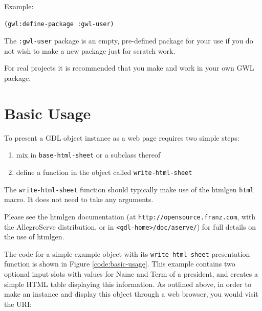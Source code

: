 \documentclass [11pt]{book}
\begin{document}
Example:

\begin{verbatim}(gwl:define-package :gwl-user)
\end{verbatim}The \texttt{:gwl-user} package is an empty, pre-defined package for your use if you 
do not wish to make a new package just for scratch work.

For real projects it is recommended that you make and work in your
own GWL package.

\section{Basic Usage}

\label{sec:basicusage}

To present a GDL object instance as a web page requires two simple
steps:

\begin{enumerate}

\item mix in \texttt{base-html-sheet} or a subclass thereof

\item define a function in the object called \texttt{write-html-sheet}

\end{enumerate}

The \texttt{write-html-sheet} function should typically make use of the htmlgen \texttt{html} macro. It does not need to take any arguments.

Please see the htmlgen documentation (at \texttt{http://opensource.franz.com}, with the AllegroServe distribution, or in \texttt{<gdl-home>/doc/aserve/}) for full details on the use of htmlgen.

The code for a simple example object with its \texttt{write-html-sheet} presentation function is shown in Figure 
\ref{code:basic-usage}. This example contains two optional input slots with 
values for Name and Term of a president, and creates a simple HTML 
table displaying this information. As outlined above, in order to 
make an instance and display this object through a web browser, you 
would visit the URI:
\end{document}
